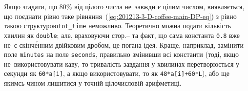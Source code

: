 

Якщо згадати, що 80\% від цілого числа не~завжди є цілим числом, виявляється, що поєднати рівно таке рівняння~(\ref{eq:201213-3-D-coffee-main-DP-eq}) з рівно такою структурою\nolinebreak[3] \texttt{tot\_time} неможливо. Теоретично можна подати кількість хвилин як \texttt{double}; але, враховуючи стор.\nolinebreak[3] \mbox{\pageref{sec:floating-point}--\pageref{text:floating-point-end}} та факт, що сама константа \verb"0.8" вже не~є скінч\'{е}нним двійковим дробом, це погана ідея. Краще, наприклад, замінити поле \texttt{minutes} на поле \texttt{seconds}, правильно змінивши всі константи (тоді, якщо не~використовувати каву, то тривалість завдання у хвилинах перетворюється у секунди як \texttt{60*a[i]}, а якщо використовувати, то як \texttt{\mbox{48*a[i]}}\nolinebreak[3]\hspace{0.125em plus 0.125em}\texttt{+}\nolinebreak[3]\hspace{0.125em plus 0.125em}\texttt{\mbox{60*L}}), або ще якимсь чином лишитися у точній цілочисловій арифметиці.